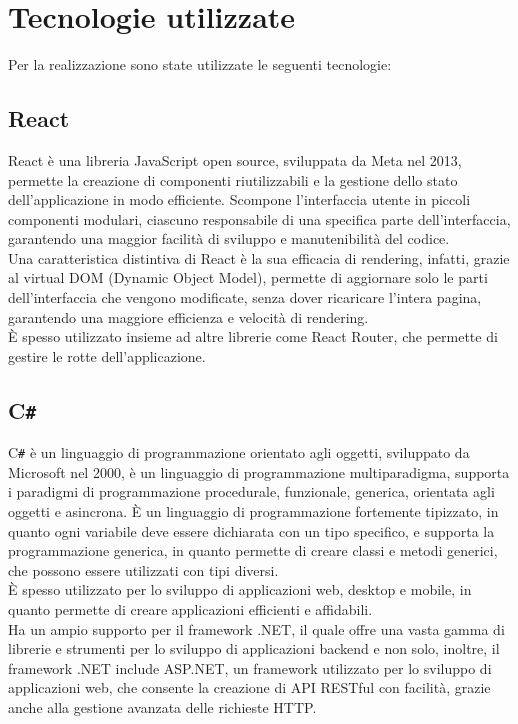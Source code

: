 \section{Tecnologie utilizzate}
Per la realizzazione sono state utilizzate le seguenti tecnologie:
\subsection{React}
React è una libreria JavaScript open source, sviluppata da Meta nel 2013, permette la creazione di componenti riutilizzabili e la gestione dello stato dell'applicazione in modo efficiente.
Scompone l'interfaccia utente in piccoli componenti modulari, ciascuno responsabile di una specifica parte dell'interfaccia, garantendo una maggior facilità di sviluppo e manutenibilità del codice.\\
Una caratteristica distintiva di React è la sua efficacia di rendering, infatti, grazie al virtual DOM (Dynamic Object Model), permette di aggiornare solo le parti dell'interfaccia che vengono modificate,
senza dover ricaricare l'intera pagina, garantendo una maggiore efficienza e velocità di rendering.\\
È spesso utilizzato insieme ad altre librerie come React Router, che permette di gestire le rotte dell'applicazione.\\

\subsection{C\texttt{\#}}
C\texttt{\#} è un linguaggio di programmazione orientato agli oggetti, sviluppato da Microsoft nel 2000, è un linguaggio di programmazione multiparadigma, supporta i paradigmi di programmazione procedurale, funzionale, generica, orientata agli oggetti e asincrona.
È un linguaggio di programmazione fortemente tipizzato, in quanto ogni variabile deve essere dichiarata con un tipo specifico, e supporta la programmazione generica, in quanto permette di creare classi e metodi generici, che possono essere utilizzati con tipi diversi.\\
È spesso utilizzato per lo sviluppo di applicazioni web, desktop e mobile, in quanto permette di creare applicazioni efficienti e affidabili.\\
Ha un ampio supporto per il framework .NET, il quale offre una vasta gamma di librerie e strumenti per lo sviluppo di applicazioni backend e non solo, inoltre, il framework .NET include
ASP.NET, un framework utilizzato per lo sviluppo di applicazioni web, che consente la creazione di API RESTful con facilità, grazie anche alla gestione avanzata delle richieste HTTP.\\

